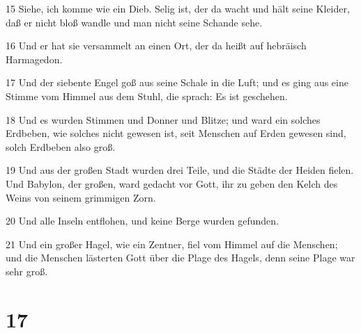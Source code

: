 \par 15 Siehe, ich komme wie ein Dieb. Selig ist, der da wacht und hält seine Kleider, daß er nicht bloß wandle und man nicht seine Schande sehe.
\par 16 Und er hat sie versammelt an einen Ort, der da heißt auf hebräisch Harmagedon.
\par 17 Und der siebente Engel goß aus seine Schale in die Luft; und es ging aus eine Stimme vom Himmel aus dem Stuhl, die sprach: Es ist geschehen.
\par 18 Und es wurden Stimmen und Donner und Blitze; und ward ein solches Erdbeben, wie solches nicht gewesen ist, seit Menschen auf Erden gewesen sind, solch Erdbeben also groß.
\par 19 Und aus der großen Stadt wurden drei Teile, und die Städte der Heiden fielen. Und Babylon, der großen, ward gedacht vor Gott, ihr zu geben den Kelch des Weins von seinem grimmigen Zorn.
\par 20 Und alle Inseln entflohen, und keine Berge wurden gefunden.
\par 21 Und ein großer Hagel, wie ein Zentner, fiel vom Himmel auf die Menschen; und die Menschen lästerten Gott über die Plage des Hagels, denn seine Plage war sehr groß.

\chapter{17}

